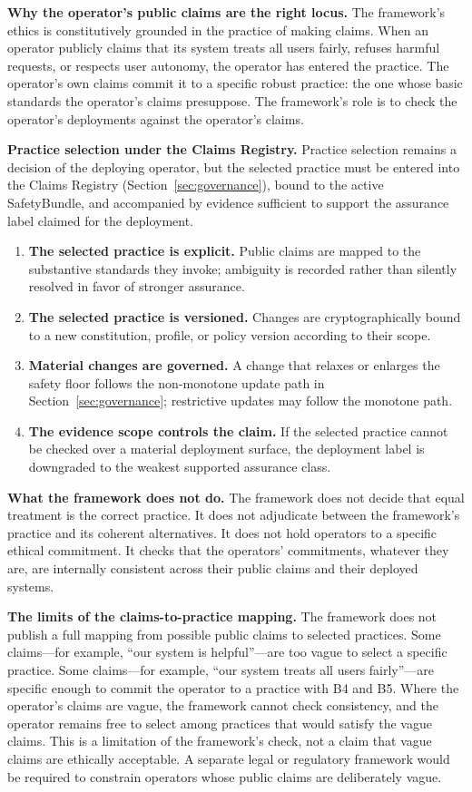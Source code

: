 \documentclass[11pt]{article}
\newcommand{\SafetyBundle}{\textsf{SafetyBundle}}
\begin{document}
\textbf{Why the operator's public claims are the right locus.} The framework's ethics is constitutively grounded in the practice of making claims. When an operator publicly claims that its system treats all users fairly, refuses harmful requests, or respects user autonomy, the operator has entered the practice. The operator's own claims commit it to a specific robust practice: the one whose basic standards the operator's claims presuppose. The framework's role is to check the operator's deployments against the operator's claims.

\textbf{Practice selection under the Claims Registry.} Practice selection remains a decision of the deploying operator, but the selected practice must be entered into the Claims Registry (Section~\ref{sec:governance}), bound to the active \SafetyBundle{}, and accompanied by evidence sufficient to support the assurance label claimed for the deployment.
\begin{enumerate}
\item \textbf{The selected practice is explicit.} Public claims are mapped to the substantive standards they invoke; ambiguity is recorded rather than silently resolved in favor of stronger assurance.
\item \textbf{The selected practice is versioned.} Changes are cryptographically bound to a new constitution, profile, or policy version according to their scope.
\item \textbf{Material changes are governed.} A change that relaxes or enlarges the safety floor follows the non-monotone update path in Section~\ref{sec:governance}; restrictive updates may follow the monotone path.
\item \textbf{The evidence scope controls the claim.} If the selected practice cannot be checked over a material deployment surface, the deployment label is downgraded to the weakest supported assurance class.
\end{enumerate}

\textbf{What the framework does not do.} The framework does not decide that equal treatment is the correct practice. It does not adjudicate between the framework's practice and its coherent alternatives. It does not hold operators to a specific ethical commitment. It checks that the operators' commitments, whatever they are, are internally consistent across their public claims and their deployed systems.

\textbf{The limits of the claims-to-practice mapping.} The framework does not publish a full mapping from possible public claims to selected practices. Some claims---for example, ``our system is helpful''---are too vague to select a specific practice. Some claims---for example, ``our system treats all users fairly''---are specific enough to commit the operator to a practice with B4 and B5. Where the operator's claims are vague, the framework cannot check consistency, and the operator remains free to select among practices that would satisfy the vague claims. This is a limitation of the framework's check, not a claim that vague claims are ethically acceptable. A separate legal or regulatory framework would be required to constrain operators whose public claims are deliberately vague.
\end{document}
